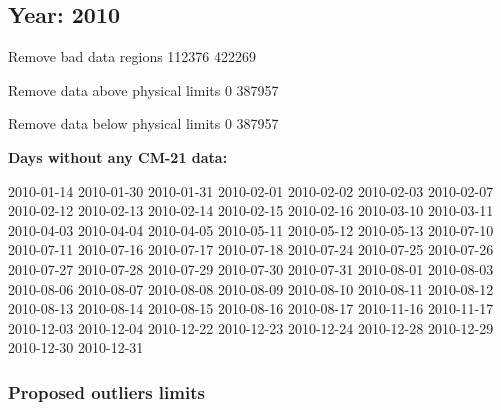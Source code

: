 \documentclass[
  10pt,
  a4paper,oneside]{article}
\begin{document}
\FloatBarrier

\newpage

\hypertarget{year-2010}{%
\subsection{Year: 2010}\label{year-2010}}

Remove bad data regions
112376 422269

Remove data above physical limits
0 387957

Remove data below physical limits
0 387957

\textbf{Days without any CM-21 data:}

2010-01-14 2010-01-30 2010-01-31 2010-02-01 2010-02-02 2010-02-03 2010-02-07 2010-02-12 2010-02-13 2010-02-14 2010-02-15 2010-02-16 2010-03-10 2010-03-11 2010-04-03 2010-04-04 2010-04-05 2010-05-11 2010-05-12 2010-05-13 2010-07-10 2010-07-11 2010-07-16 2010-07-17 2010-07-18 2010-07-24 2010-07-25 2010-07-26 2010-07-27 2010-07-28 2010-07-29 2010-07-30 2010-07-31 2010-08-01 2010-08-03 2010-08-06 2010-08-07 2010-08-08 2010-08-09 2010-08-10 2010-08-11 2010-08-12 2010-08-13 2010-08-14 2010-08-15 2010-08-16 2010-08-17 2010-11-16 2010-11-17 2010-12-03 2010-12-04 2010-12-22 2010-12-23 2010-12-24 2010-12-28 2010-12-29 2010-12-30 2010-12-31

\hypertarget{proposed-outliers-limits-17}{%
\subsubsection{Proposed outliers limits}\label{proposed-outliers-limits-17}}

\footnotesize
\end{document}
